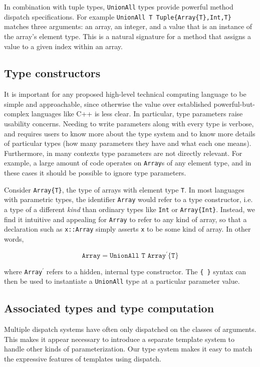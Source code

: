 In combination with tuple types, \texttt{UnionAll} types provide powerful
method dispatch specifications. For example
\texttt{UnionAll T Tuple\{Array\{T\},Int,T\}} matches three arguments:
an array, an integer, and a value that is an instance of the array's
element type. This is a natural signature for a method that assigns a
value to a given index within an array.


\subsection{Type constructors}

It is important for any proposed high-level technical computing language to be
simple and approachable, since otherwise the value over established
powerful-but-complex languages like C++ is less clear.
In particular, type parameters raise usability concerns.
Needing to write parameters along with every type is verbose, and requires users
to know more about the type system and to know more details of particular
types (how many parameters they have and what each one means).
Furthermore, in many contexts type parameters are not directly relevant.
For example, a large amount of code operates on \texttt{Array}s of any
element type, and in these cases it should be possible to ignore type parameters.

Consider \texttt{Array\{T\}}, the type of arrays with element type \texttt{T}.
In most languages with parametric types, the identifier \texttt{Array} would
refer to a type constructor, i.e. a type of a different \emph{kind} than
ordinary types like \texttt{Int} or \texttt{Array\{Int\}}.
Instead, we find it intuitive and appealing for \texttt{Array} to refer to
any kind of array, so that a declaration such as \texttt{x::Array} simply
asserts \texttt{x} to be some kind of array. In other words,

\vspace{-3ex}
\[
\texttt{Array} = \texttt{UnionAll T Array$^\prime$\{T\}}
\]

\noindent
where \texttt{Array$^\prime$} refers to a hidden, internal type constructor.
The \texttt{\{ \}} syntax can then be used to instantiate a \texttt{UnionAll}
type at a particular parameter value.

\subsection{Associated types and type computation}

Multiple dispatch systems have often only dispatched on the classes of
arguments.
This makes it appear necessary to introduce a separate
template system to handle other kinds of parameterization.
Our type system makes it easy to match the expressive features of
templates using dispatch.

